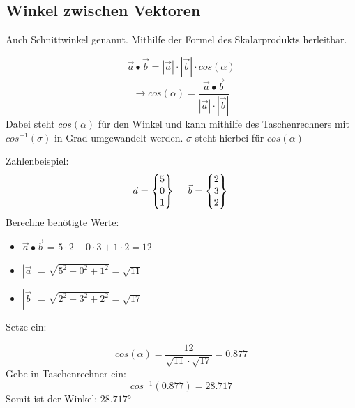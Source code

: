 \subsection{Winkel zwischen Vektoren}
\label{sec:winkel_vektoren}
Auch Schnittwinkel genannt. Mithilfe der Formel des Skalarprodukts herleitbar. 

\[\vec{a} \bullet \vec{b} = |\vec{a}| \cdot |\vec{b}| \cdot cos(\alpha) \]
\[\rightarrow cos(\alpha) = \frac{\vec{a}\bullet \vec{b}}{|\vec{a}|\cdot |\vec{b}|} \]
Dabei steht $cos(\alpha)$ für den Winkel und kann mithilfe des Taschenrechners mit $cos^{-1}(\sigma)$ in Grad umgewandelt werden. 
$\sigma$ steht hierbei für $cos(\alpha)$ 

Zahlenbeispiel: 
\[
\vec{a} = 
\begin{Bmatrix}
    5 \\ 0 \\ 1
\end{Bmatrix} 
\ \ \ \
\vec{b} = 
\begin{Bmatrix}
    2 \\ 3 \\ 2
\end{Bmatrix} \\
\]
Berechne benötigte Werte:
\begin{itemize}
    \item $\vec{a} \bullet \vec{b}$ = $5 \cdot 2 + 0 \cdot 3 + 1 \cdot 2 = 12$
    \item $|\vec{a}|$ = $\sqrt{5^2 + 0^2 + 1^2} = \sqrt{11}$
    \item $|\vec{b}|$ = $\sqrt{2^2 + 3^2 + 2^2} = \sqrt{17}$
\end{itemize}
Setze ein: 

\[cos(\alpha) = \frac{12}{\sqrt{11}\cdot \sqrt{17}} = 0.877 \]
Gebe in Taschenrechner ein: 
\[cos^{-1}(0.877) = 28.717 \]
Somit ist der Winkel: $28.717$°
